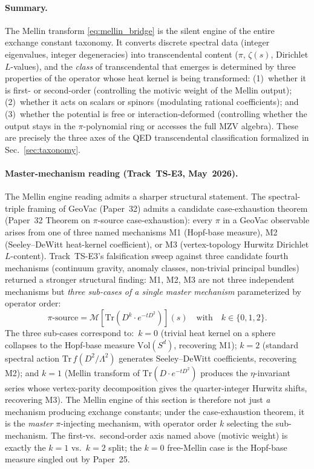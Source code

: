 \documentclass[aps,pra,twocolumn,superscriptaddress,longbibliography]{revtex4-2}
\begin{document}
\paragraph{Summary.}
The Mellin transform \eqref{eq:mellin_bridge} is the silent engine
of the entire exchange constant taxonomy.  It converts discrete
spectral data (integer eigenvalues, integer degeneracies) into
transcendental content ($\pi$, $\zeta(s)$, Dirichlet $L$-values),
and the \emph{class} of transcendental that emerges is determined by
three properties of the operator whose heat kernel is being
transformed: (1)~whether it is first- or second-order (controlling
the motivic weight of the Mellin output); (2)~whether it acts on
scalars or spinors (modulating rational coefficients); and
(3)~whether the potential is free or interaction-deformed (controlling
whether the output stays in the $\pi$-polynomial ring or accesses the
full MZV algebra).  These are precisely the three axes of the QED
transcendental classification formalized in
Sec.~\ref{sec:taxonomy}.

\paragraph{Master-mechanism reading (Track~TS-E3, May~2026).}
The Mellin engine reading admits a sharper structural statement.  The
spectral-triple framing of GeoVac (Paper~32) admits a candidate
case-exhaustion theorem (Paper~32 Theorem on $\pi$-source
case-exhaustion): every $\pi$ in a GeoVac observable arises from one
of three named mechanisms M1 (Hopf-base measure), M2 (Seeley--DeWitt
heat-kernel coefficient), or M3 (vertex-topology Hurwitz Dirichlet
$L$-content).  Track~TS-E3's falsification sweep against three
candidate fourth mechanisms (continuum gravity, anomaly classes,
non-trivial principal bundles) returned a stronger structural finding:
M1, M2, M3 are not three independent mechanisms but \emph{three sub-cases
of a single master mechanism} parameterized by operator order:
\begin{equation}
\label{eq:master_mellin}
\pi\text{-source} = \mathcal{M}\!\left[ \mathrm{Tr}(D^k \cdot e^{-tD^2}) \right](s)
\quad\text{with}\quad k \in \{0, 1, 2\}.
\end{equation}
The three sub-cases correspond to:\ $k = 0$ (trivial heat kernel on a
sphere collapses to the Hopf-base measure $\mathrm{Vol}(S^d)$, recovering
M1); $k = 2$ (standard spectral action $\mathrm{Tr}\,f(D^2/\Lambda^2)$
generates Seeley--DeWitt coefficients, recovering M2); and $k = 1$
(Mellin transform of $\mathrm{Tr}(D \cdot e^{-tD^2})$ produces the
$\eta$-invariant series whose vertex-parity decomposition gives the
quarter-integer Hurwitz shifts, recovering M3).  The Mellin engine of
this section is therefore not just \emph{a} mechanism producing
exchange constants; under the case-exhaustion theorem, it is the
\emph{master} $\pi$-injecting mechanism, with operator order $k$
selecting the sub-mechanism.  The first-vs.\ second-order axis named
above (motivic weight) is exactly the $k = 1$ vs.\ $k = 2$ split; the
$k = 0$ free-Mellin case is the Hopf-base measure singled out by Paper~25.
\end{document}
